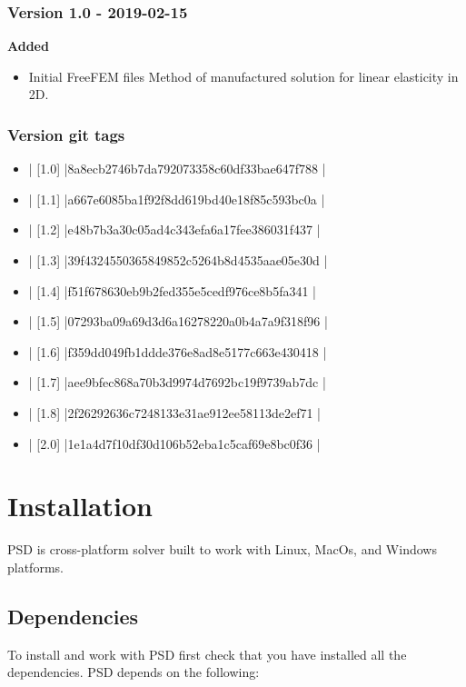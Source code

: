 \documentclass{report}
\begin{document}
\subsection{Version 1.0 - 2019-02-15}

\textbf{Added}
\begin{itemize}
\item Initial FreeFEM files  Method of manufactured solution for linear elasticity in 2D.
\end{itemize}

\subsection{Version git tags}
\begin{itemize}
\item | [1.0]      |8a8ecb2746b7da792073358c60df33bae647f788 |
\item | [1.1]     |a667e6085ba1f92f8dd619bd40e18f85c593bc0a |
\item | [1.2]        |e48b7b3a30c05ad4c343efa6a17fee386031f437 |
\item | [1.3]       |39f4324550365849852c5264b8d4535aae05e30d |
\item | [1.4]        |f51f678630eb9b2fed355e5cedf976ce8b5fa341 |
\item | [1.5]        |07293ba09a69d3d6a16278220a0b4a7a9f318f96 |
\item | [1.6]        |f359dd049fb1ddde376e8ad8e5177c663e430418 |
\item | [1.7]       |aee9bfec868a70b3d9974d7692bc19f9739ab7dc |
\item | [1.8]       |2f26292636c7248133e31ae912ee58113de2ef71 |
\item | [2.0]       |1e1a4d7f10df30d106b52eba1c5caf69e8bc0f36 |
\end{itemize}

\chapter{Installation}


PSD is cross-platform solver built to work with Linux, MacOs, and Windows platforms. 

\section{Dependencies}

To install and work with PSD first check that you have installed all the dependencies. PSD depends on the following:   
\end{document}
